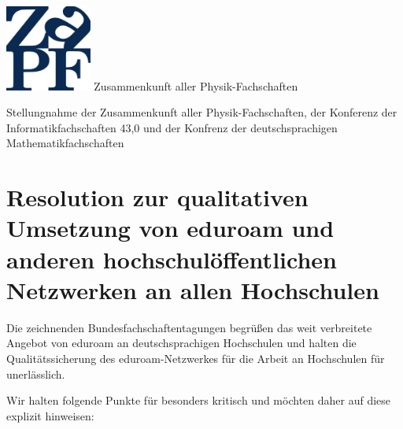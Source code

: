 \documentclass[DIV=calc]{scrartcl}
\begin{document}
\begin{adjustbox}{center}
\begin{minipage}{1.2\textwidth}
\begin{minipage}[c]{0.25\textwidth}
	\end{minipage}
	\hfill
	\begin{minipage}{4cm}
		\begin{minipage}{120pt}
			\vspace{-1.8cm}
			\includegraphics[width=80pt]{../../logo.pdf}
			\centering
			\small Zusammenkunft aller Physik-Fachschaften
		\end{minipage}
	\end{minipage}
\end{minipage}
\end{adjustbox}
\vspace{0.3cm}
\begin{center}
\huge{Stellungnahme der Zusammenkunft aller Physik-Fachschaften, der Konferenz
der Informatikfachschaften 43,0 und der Konfrenz der deutschsprachigen Mathematikfachschaften} \\
\normalsize
\end{center}

\vspace{0.4cm}
\section*{Resolution zur qualitativen Umsetzung von  eduroam und anderen
hochschulöffentlichen Netzwerken an allen Hochschulen}

Die zeichnenden Bundesfachschaftentagungen begrüßen das weit verbreitete
Angebot von eduroam an deutschsprachigen Hochschulen und halten die
Qualitätssicherung des eduroam-Netzwerkes für die Arbeit an Hochschulen für
unerlässlich.

Wir halten folgende Punkte für besonders kritisch und möchten daher auf diese
explizit hinweisen:
\end{document}
